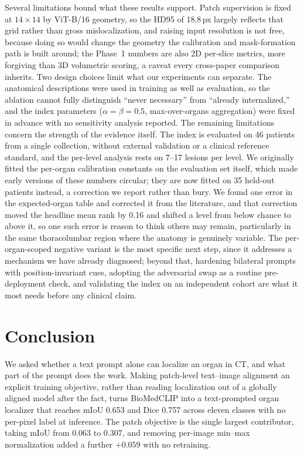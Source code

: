 \documentclass[10pt]{article}
\begin{document}
Several limitations bound what these results support. Patch supervision is
fixed at $14\times14$ by ViT-B/16 geometry, so the HD95 of 18.8\,px largely
reflects that grid rather than gross mislocalization, and raising input
resolution is not free, because doing so would change the geometry the
calibration and mask-formation path is built around; the Phase~1 numbers are
also 2D per-slice metrics, more forgiving than 3D volumetric scoring, a
caveat every cross-paper comparison inherits. Two design choices limit what
our experiments can separate. The anatomical descriptions were used in
training as well as evaluation, so the ablation cannot fully distinguish
``never necessary'' from ``already internalized,'' and the index parameters
($\alpha=\beta=0.5$, max-over-organs aggregation) were fixed in advance with
no sensitivity analysis reported. The remaining limitations concern the
strength of the evidence itself. The index is evaluated on 46 patients from a
single collection, without external validation or a clinical reference
standard, and the per-level analysis rests on 7--17 lesions per level. We
originally fitted the per-organ calibration constants on the evaluation set
itself, which made early versions of these numbers circular; they are now
fitted on 35 held-out patients instead, a correction we report rather than
bury. We found one error in the expected-organ table and corrected it from
the literature, and that correction moved the headline mean rank by 0.16 and
shifted a level from below chance to above it, so one such error is reason to
think others may remain, particularly in the same thoracolumbar region where
the anatomy is genuinely variable. The per-organ-scoped negative variant is
the most specific next step, since it addresses a mechanism we have already
diagnosed; beyond that, hardening bilateral prompts with position-invariant
cues, adopting the adversarial swap as a routine pre-deployment check, and
validating the index on an independent cohort are what it most needs before
any clinical claim.

\section{Conclusion}
\label{sec:conclusion}

We asked whether a text prompt alone can localize an organ in CT, and what part
of the prompt does the work. Making patch-level text--image alignment an explicit
training objective, rather than reading localization out of a globally aligned
model after the fact, turns BioMedCLIP into a text-prompted organ localizer that
reaches mIoU 0.653 and Dice 0.757 across eleven classes with no per-pixel label at
inference. The patch objective is the single largest contributor, taking mIoU from
0.063 to 0.307, and removing per-image min--max normalization added a further
$+0.059$ with no retraining.
\end{document}
